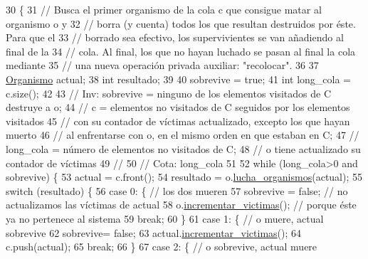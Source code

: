 \begin{DoxyCode}
30 \{
31 \textcolor{comment}{// Busca el primer organismo de la cola c que consigue matar al organismo o y}
32 \textcolor{comment}{// borra (y cuenta) todos los que resultan destruidos por éste. Para que el}
33 \textcolor{comment}{// borrado sea efectivo, los supervivientes se van añadiendo al final de la }
34 \textcolor{comment}{// cola. Al final, los que no hayan luchado se pasan al final la cola mediante}
35 \textcolor{comment}{// una nueva operación privada auxiliar: "recolocar".}
36 
37    \hyperlink{class_organismo}{Organismo} actual; 
38    \textcolor{keywordtype}{int} resultado; 
39  
40    sobrevive = \textcolor{keyword}{true};
41    \textcolor{keywordtype}{int} long\_cola = c.size();
42   
43 \textcolor{comment}{// Inv: sobrevive = ninguno de los elementos visitados de C destruye a o;}
44 \textcolor{comment}{//      c = elementos no visitados de C seguidos por los elementos visitados}
45 \textcolor{comment}{//      con su contador de víctimas actualizado, excepto los que hayan muerto }
46 \textcolor{comment}{//      al enfrentarse con o, en el mismo orden en que estaban en C;}
47 \textcolor{comment}{//      long\_cola = número de elementos no visitados de C;}
48 \textcolor{comment}{//      o tiene actualizado su contador de víctimas}
49 \textcolor{comment}{// }
50 \textcolor{comment}{// Cota: long\_cola}
51 
52    \textcolor{keywordflow}{while} (long\_cola>0 and sobrevive) \{
53       actual = c.front();
54       resultado = o.\hyperlink{class_organismo_a2f4573f69288fa8ec05ec709f2336a8d}{lucha\_organismos}(actual);
55       \textcolor{keywordflow}{switch} (resultado) \{
56          \textcolor{keywordflow}{case} 0: \{                    \textcolor{comment}{// los dos mueren}
57             sobrevive = \textcolor{keyword}{false};        \textcolor{comment}{// no actualizamos las víctimas de actual }
58             o.\hyperlink{class_organismo_ae498385e40b42c4e9b11226befd6e4c6}{incrementar\_victimas}(); \textcolor{comment}{// porque éste ya no pertenece al sistema}
59             \textcolor{keywordflow}{break};
60          \} 
61          \textcolor{keywordflow}{case} 1: \{                    \textcolor{comment}{// o muere, actual sobrevive}
62             sobrevive= \textcolor{keyword}{false};
63             actual.\hyperlink{class_organismo_ae498385e40b42c4e9b11226befd6e4c6}{incrementar\_victimas}();
64             c.push(actual);
65             \textcolor{keywordflow}{break};
66          \}
67          \textcolor{keywordflow}{case} 2: \{                    \textcolor{comment}{// o sobrevive, actual muere}

\end{DoxyCode}
